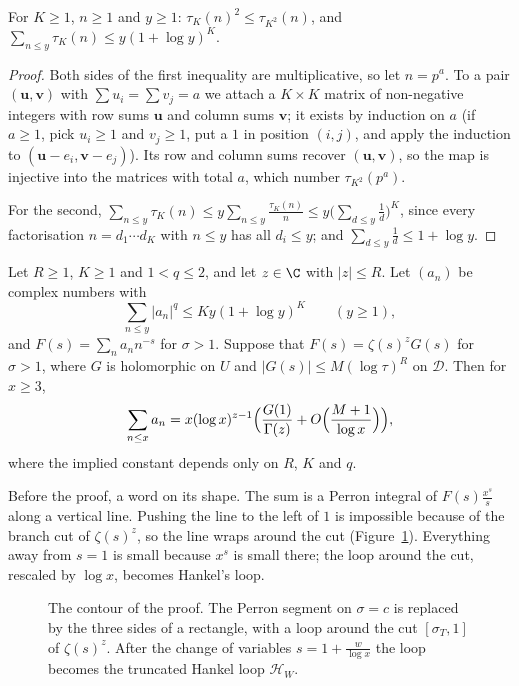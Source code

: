 \begin{lemma}\label{lem:taupower}
For $K\ge1$, $n\ge1$ and $y\ge1$: $\tau_K(n)^2\le\tau_{K^2}(n)$, and $\sum_{n\le y}\tau_K(n)\le y(1+\log y)^K$.
\end{lemma}
\begin{proof}
Both sides of the first inequality are multiplicative, so let $n=p^a$. To a pair $(\mathbf u,\mathbf v)$ with $\sum u_i=\sum v_j=a$ we attach a $K\times K$ matrix of non-negative integers with row sums $\mathbf u$ and column sums $\mathbf v$; it exists by induction on $a$ (if $a\ge1$, pick $u_i\ge1$ and $v_j\ge1$, put a $1$ in position $(i,j)$, and apply the induction to $(\mathbf u-e_i,\mathbf v-e_j)$). Its row and column sums recover $(\mathbf u,\mathbf v)$, so the map is injective into the matrices with total $a$, which number $\tau_{K^2}(p^a)$.

For the second, $\sum_{n\le y}\tau_K(n)\le y\sum_{n\le y}\frac{\tau_K(n)}n\le y\bigl(\sum_{d\le y}\frac1d\bigr)^K$, since every factorisation $n=d_1\cdots d_K$ with $n\le y$ has all $d_i\le y$; and $\sum_{d\le y}\frac1d\le1+\log y$.
\end{proof}

\begin{theorem}\label{thm:sd}
Let $R\ge1$, $K\ge1$ and $1<q\le2$, and let $z\in\C$ with $|z|\le R$. Let $(a_n)$ be complex numbers with
\[
\sum_{n\le y}|a_n|^q\le Ky(1+\log y)^K\qquad(y\ge1),
\]
and $F(s)=\sum_na_nn^{-s}$ for $\sigma>1$. Suppose that $F(s)=\zeta(s)^zG(s)$ for $\sigma>1$, where $G$ is holomorphic on $U$ and $|G(s)|\le M(\log\tau)^R$ on $\mathcal D$. Then for $x\ge3$,
\[
\sum_{n\le x}a_n=x(\log x)^{z-1}\Bigl(\frac{G(1)}{\Gamma(z)}+O\Bigl(\frac{M+1}{\log x}\Bigr)\Bigr),
\]
where the implied constant depends only on $R$, $K$ and $q$.
\end{theorem}

Before the proof, a word on its shape. The sum is a Perron integral of $F(s)\frac{x^s}s$ along a vertical line. Pushing the line to the left of $1$ is impossible because of the branch cut of $\zeta(s)^z$, so the line wraps around the cut (Figure~\ref{fig:hankel}). Everything away from $s=1$ is small because $x^s$ is small there; the loop around the cut, rescaled by $\log x$, becomes Hankel's loop.

\begin{figure}[ht]
\centering{}
\caption{The contour of the proof. The Perron segment on $\sigma=c$ is replaced by the three sides of a rectangle, with a loop around the cut $[\sigma_T,1]$ of $\zeta(s)^z$. After the change of variables $s=1+\frac w{\log x}$ the loop becomes the truncated Hankel loop $\mathcal H_W$.}
\label{fig:hankel}
\end{figure}

